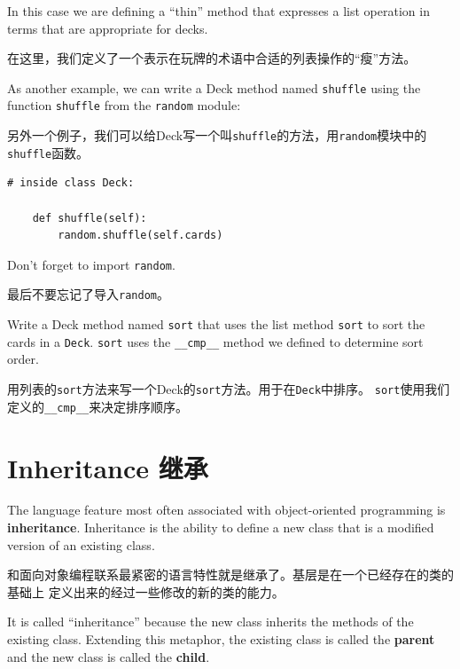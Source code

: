 \documentclass[10pt]{book}
\begin{document}
\begin{CJK}{UTF8}{gbsn}
In this case we are defining a ``thin'' method that expresses
a list operation in terms that are appropriate for decks.

在这里，我们定义了一个表示在玩牌的术语中合适的列表操作的``瘦''方法。

As another example, we can write a Deck method named {\tt shuffle}
using the function {\tt shuffle} from the {\tt random} module:

另外一个例子，我们可以给Deck写一个叫{\tt shuffle}的方法，用{\tt random}模块中的
{\tt shuffle}函数。

\begin{verbatim}
# inside class Deck:
            
    def shuffle(self):
        random.shuffle(self.cards)
\end{verbatim}
%
Don't forget to import {\tt random}.

最后不要忘记了导入{\tt random}。

\begin{exercise}

Write a Deck method named {\tt sort} that uses the list method
{\tt sort} to sort the cards in a {\tt Deck}.  {\tt sort} uses
the \verb"__cmp__" method we defined to determine sort order.
\end{exercise}

用列表的{\tt sort}方法来写一个Deck的{\tt sort}方法。用于在{\tt Deck}中排序。
{\tt sort}使用我们定义的\verb"__cmp__"来决定排序顺序。



\section{Inheritance 继承}

The language feature most often associated with object-oriented
programming is {\bf inheritance}.  Inheritance is the ability to
define a new class that is a modified version of an existing
class.

和面向对象编程联系最紧密的语言特性就是继承了。基层是在一个已经存在的类的基础上
定义出来的经过一些修改的新的类的能力。

It is called ``inheritance'' because the new class inherits the
methods of the existing class.  Extending this metaphor, the existing
class is called the {\bf parent} and the new class is
called the {\bf child}.


\end{CJK}
\end{document}
